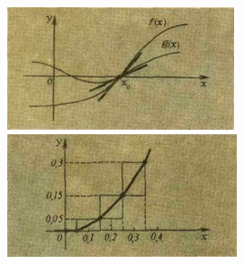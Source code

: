 \documentclass[10dd, a5paper]{article}
\begin{document}
\pagestyle{fancy}
\fancyfoot{}
\fancyfoot[LO]{\textbf{\LARGE\thepage}}
\setlength{\textfloatsep}{3dd}
\setlength{\belowdisplayskip}{1dd} \setlength{\belowdisplayshortskip}{1dd}
\setlength{\abovedisplayskip}{1dd} \setlength{\abovedisplayshortskip}{1dd}
\setlength{\parskip}{2dd}
\begin{figure}
\centering
\begin{minipage}{0.48\textwidth}
	\raggedleft
	\includegraphics[width =\linewidth, height = 3.6cm]{fig1}
	\caption{.}
	\label{fig:left}
\end{minipage}%
\hspace{0.5cm}%
\begin{minipage}{0.48\textwidth}
	\raggedleft
	\includegraphics[width =\linewidth, height = 3.6cm]{fig2}
	\caption{}
	\label{fig:right}
\end{minipage}
\end{figure}
\setlength{\textfloatsep}{2dd}
\end{document}
